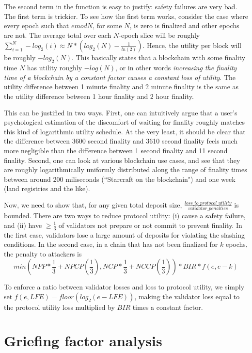 \documentclass[12pt]{article}
\begin{document}
The second term in the function is easy to justify: safety failures are very bad. The first term is trickier. To see how the first term works, consider the case where every epoch such that $e mod N$, for some $N$, is zero is finalized and other epochs are not. The average total over each $N$-epoch slice will be roughly $\sum_{i=1}^N -log_2(i) \approx N * (log_2(N) - \frac{1}{ln(2)})$. Hence, the utility per block will be roughly $-log_2(N)$. This basically states that a blockchain with some finality time $N$ has utility roughly $-log(N)$, or in other words \textit{increasing the finality time of a blockchain by a constant factor causes a constant loss of utility}. The utility difference between 1 minute finality and 2 minute finality is the same as the utility difference between 1 hour finality and 2 hour finality.

This can be justified in two ways. First, one can intuitively argue that a user's psychological estimation of the discomfort of waiting for finality roughly matches this kind of logarithmic utility schedule. At the very least, it should be clear that the difference between 3600 second finality and 3610 second finality feels much more negligible than the difference between 1 second finality and 11 second finality. Second, one can look at various blockchain use cases, and see that they are roughly logarithmically uniformly distributed along the range of finality times between around 200 miliseconds (``Starcraft on the blockchain") and one week (land registries and the like).

Now, we need to show that, for any given total deposit size, $\frac{loss\_to\_protocol\_utility}{validator\_penalties}$ is bounded. There are two ways to reduce protocol utility: (i) cause a safety failure, and (ii) have $\ge \frac{1}{3}$ of validators not prepare or not commit to prevent finality. In the first case, validators lose a large amount of deposits for violating the slashing conditions. In the second case, in a chain that has not been finalized for $k$ epochs, the penalty to attackers is $$min(NPP * \frac{1}{3} + NPCP(\frac{1}{3}), NCP * \frac{1}{3} + NCCP(\frac{1}{3})) * BIR * f(e, e-k)$$

To enforce a ratio between validator losses and loss to protocol utility, we simply set $f(e, LFE) = floor(log_2(e - LFE))$, making the validator loss equal to the protocol utility loss multiplied by $BIR$ times a constant factor.

\section{Griefing factor analysis}
\end{document}
